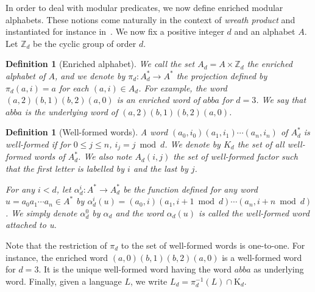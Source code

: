 \documentclass[submission,hidelink]{dmtcs-episciences}
\newtheorem{definition}[theorem]{Definition}
\newcommand{\WF}{K}
\newcommand{\WFp}[1]{\textrm{K}_{#1}}
\newcommand{\Zd}{\Z_d}
\newcommand{\Z}{{\mathbb Z}}     \newcommand{\N}{{\mathbb N}}
\renewcommand{\leq}{\leqslant}
\newcommand{\Ae}{A_d}
\begin{document}
In order to deal with modular predicates, we now define enriched modular alphabets. These notions come naturally in the context of \emph{wreath product} and instantiated for instance in~\cite{DP13,DP15}.
We now fix a positive integer $d$ and an alphabet $A$. Let $\Zd$ be the cyclic group of order $d$.
	\begin{definition}[Enriched alphabet]
		We call the set $\Ae=A\times \Zd$
		the \emph{enriched alphabet} of $A$,
		and we denote by $\pi_d:\Ae^*\to A^*$ the projection defined by $\pi_d(a,i)=a$
		for each $(a,i)\in \Ae$.
		For example,
		the word $(a,2)(b,1)(b,2)(a,0)$ is an enriched word of $abba$ for $d=3$.
		We say that $abba$ is the \emph{underlying word} of $(a,2)(b,1)(b,2)(a,0)$.
	\end{definition}
	\begin{definition}[Well-formed words]
		A word $(a_0,i_0)(a_1,i_1)\dotsm(a_n,i_n)$ of $\Ae^*$ is \emph{well-formed} if
		for $0\leq j\leq n$, $i_j = j \bmod d$. We denote by $\WF_d$ the set of
		all well-formed words of $\Ae^*$.
We also note $\Ae(i,j)$ the set of well-formed factor such that the first letter is labelled by $i$ and the last by $j$.

		For any $i<d$, let $\alpha_d^i: A^*\to \Ae^*$ be the function defined
		for any word $u=a_0a_1\dotsm a_n\in A^*$
		by $\alpha_d^i(u)=(a_0,i)
		(a_1,i+1\bmod d)\dotsm(a_n,i+n\bmod{d})$.
		We simply denote $\alpha_d^0$ by $\alpha_d$ and the word $\alpha_d(u)$ is called the \emph{well-formed word attached} to u.
	\end{definition}

		Note that the restriction of $\pi_d$ to the set of well-formed words is one-to-one.
		For instance, the enriched word $(a,0)(b,1)(b,2)(a,0)$ is a well-formed word for $d=3$.
		It is the unique well-formed word having the word
	$abba$ as underlying word. Finally, given a language $L$, we write $L_d=\pi_d^{-1}(L)\cap \WFp{d}$.
\end{document}
